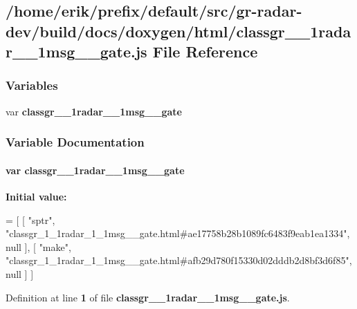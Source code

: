 \subsection{/home/erik/prefix/default/src/gr-\/radar-\/dev/build/docs/doxygen/html/classgr\+\_\+\_\+1radar\+\_\+\_\+1msg\+\_\+\+\_\+gate.js File Reference}
\label{classgr__1__1radar__1__1msg____gate_8js}
\subsubsection*{Variables}
\begin{DoxyCompactItemize}
\item 
var {\bf classgr\+\_\+\_\+1radar\+\_\+\_\+1msg\+\_\+\+\_\+gate}
\end{DoxyCompactItemize}


\subsubsection{Variable Documentation}
\paragraph[{classgr\+\_\+1\+\_\+1radar\+\_\+1\+\_\+1msg\+\_\+\+\_\+gate}]{\setlength{\rightskip}{0pt plus 5cm}var classgr\+\_\+\_\+1radar\+\_\+\_\+1msg\+\_\+\+\_\+gate}\label{classgr__1__1radar__1__1msg____gate_8js_abcd7b968f574adae718799472aef887e}
{\bfseries Initial value\+:}
\begin{DoxyCode}
=
[
    [ \textcolor{stringliteral}{"sptr"}, \textcolor{stringliteral}{"classgr\_1\_1radar\_1\_1msg\_\_gate.html#ae17758b28b1089fc6483f9eab1ea1334"}, null ],
    [ \textcolor{stringliteral}{"make"}, \textcolor{stringliteral}{"classgr\_1\_1radar\_1\_1msg\_\_gate.html#afb29d780f15330d02dddb2d8bf3d6f85"}, null ]
]
\end{DoxyCode}


Definition at line {\bf 1} of file {\bf classgr\+\_\+\_\+1radar\+\_\+\_\+1msg\+\_\+\+\_\+gate.\+js}.

